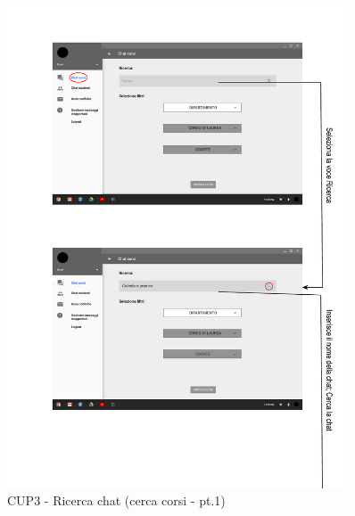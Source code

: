 \begin{figure}
	\centering
	\includegraphics[width=0.9\textwidth]{imgs/gruppo6/activities/act_cup3_ricerca_chat_corsi1.pdf}
	\caption{CUP3 - Ricerca chat (cerca corsi - pt.1)}
	\label{fig:cup3-5}
\end{figure}

